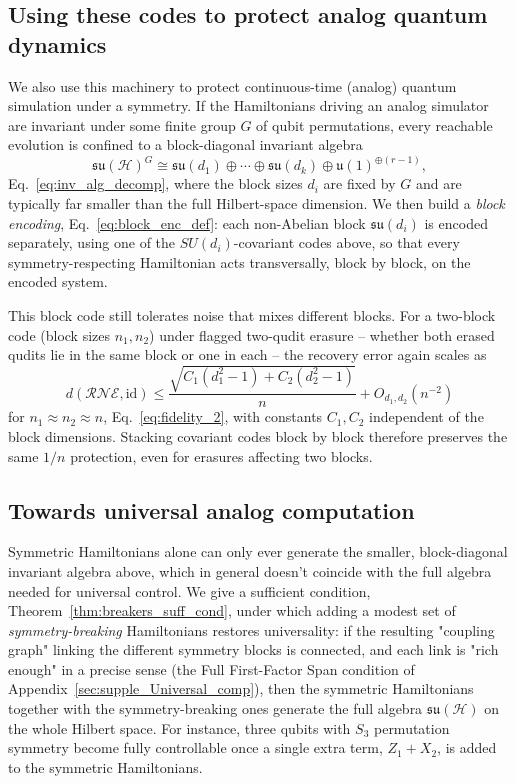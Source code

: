 \documentclass[10pt,twocolumn,superscriptaddress,aps,amsmath,amssymb,citeautoscript,floatfix,prx]{revtex4-2}
\newcounter{alg}
\theoremstyle{plain}
\theoremstyle{plain}
\theoremstyle{plain}
\theoremstyle{plain}
\theoremstyle{plain}
\theoremstyle{plain}
\theoremstyle{plain}
\theoremstyle{definition}
\theoremstyle{plain}
\begin{document}
\subsection{Using these codes to protect analog quantum dynamics}\label{subsec:summary_analog}
 
We also use this machinery to protect continuous-time (analog) quantum simulation under a symmetry. If the Hamiltonians driving an analog simulator are invariant under some finite group $G$ of qubit permutations, 
every reachable evolution is confined to a block-diagonal invariant algebra
$$
\mathfrak{su}(\mathcal H)^G\cong \mathfrak{su}(d_1)\oplus\cdots\oplus\mathfrak{su}(d_k)\oplus\mathfrak u(1)^{\oplus(r-1)},
$$
Eq.~\eqref{eq:inv_alg_decomp}, where the block sizes $d_i$ are fixed by $G$ and are typically far smaller than the full Hilbert-space dimension. 
We then build a \emph{block encoding}, Eq.~\eqref{eq:block_enc_def}: each non-Abelian block $\mathfrak{su}(d_i)$ is encoded separately, using one of the $SU(d_i)$-covariant codes above, 
so that every symmetry-respecting Hamiltonian acts transversally, block by block, on the encoded system.
 
This block code still tolerates noise that mixes different blocks. For a two-block code (block sizes $n_1,n_2$) under flagged two-qudit erasure -- whether both erased 
qudits lie in the same block or one in each -- the recovery error again scales as
$$
d(\mathcal R\mathcal N\mathcal E,\mathrm{id})\le\frac{\sqrt{C_1(d_1^2-1)+C_2(d_2^2-1)}}{n}+O_{d_1,d_2}(n^{-2})
$$
for $n_1\approx n_2\approx n$, Eq.~\eqref{eq:fidelity_2}, with constants $C_1,C_2$ independent of the block dimensions. 
Stacking covariant codes block by block therefore preserves the same $1/n$ protection, even for erasures affecting two blocks.
 
\subsection{Towards universal analog computation}\label{subsec:summary_universal}
 
Symmetric Hamiltonians alone can only ever generate the smaller, block-diagonal invariant algebra above, which in general doesn't 
coincide with the full algebra needed for universal control. We give a sufficient condition, Theorem~\ref{thm:breakers_suff_cond}, 
under which adding a modest set of \emph{symmetry-breaking} Hamiltonians restores universality: if the resulting "coupling graph" 
linking the different symmetry blocks is connected, and each link is "rich enough" in a precise sense 
(the Full First-Factor Span condition of Appendix~\ref{sec:supple_Universal_comp}), then the symmetric Hamiltonians together with the 
symmetry-breaking ones generate the full algebra $\mathfrak{su}(\mathcal H)$ on the whole Hilbert space. 
For instance, three qubits with $S_3$ permutation symmetry become fully controllable once a single extra term, $Z_1+X_2$, is added to the symmetric Hamiltonians.
 
\end{document}
